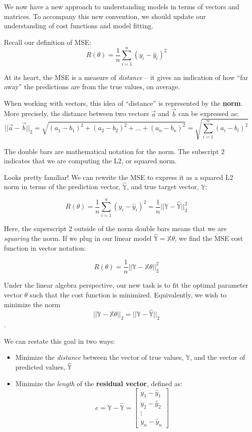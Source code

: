 \documentclass[
  letterpaper,
  DIV=11,
  numbers=noendperiod]{scrreprt}
\providecommand{\tightlist}{%
  \setlength{\itemsep}{0pt}\setlength{\parskip}{0pt}}\usepackage{longtable,booktabs,array}
\begin{document}
We now have a new approach to understanding models in terms of vectors
and matrices. To accompany this new convention, we should update our
understanding of cost functions and model fitting.

Recall our definition of MSE:
\[R(\theta) = \frac{1}{n} \sum_{i=1}^n (y_i - \hat{y}_i)^2\]

At its heart, the MSE is a measure of \emph{distance} -- it gives an
indication of how ``far away'' the predictions are from the true values,
on average.

When working with vectors, this idea of ``distance'' is represented by
the \textbf{norm}. More precisely, the distance between two vectors
\(\vec{a}\) and \(\vec{b}\) can be expressed as:
\[||\vec{a} - \vec{b}||_2 = \sqrt{(a_1 - b_1)^2 + (a_2 - b_2)^2 + \ldots + (a_n - b_n)^2} = \sqrt{\sum_{i=1}^n (a_i - b_i)^2}\]

The double bars are mathematical notation for the norm. The subscript 2
indicates that we are computing the L2, or squared norm.

Looks pretty familiar! We can rewrite the MSE to express it as a squared
L2 norm in terms of the prediction vector, \(\hat{\mathbb{Y}}\), and
true target vector, \(\mathbb{Y}\):

\[R(\theta) = \frac{1}{n} \sum_{i=1}^n (y_i - \hat{y}_i)^2 = \frac{1}{n} ||\mathbb{Y} - \hat{\mathbb{Y}}||_2^2\]

Here, the superscript 2 outside of the norm double bars means that we
are \emph{squaring} the norm. If we plug in our linear model
\(\hat{\mathbb{Y}} = \mathbb{X} \theta\), we find the MSE cost function
in vector notation:

\[R(\theta) = \frac{1}{n} ||\mathbb{Y} - \mathbb{X} \theta||_2^2\]

Under the linear algebra perspective, our new task is to fit the optimal
parameter vector \(\theta\) such that the cost function is minimized.
Equivalently, we wish to minimize the norm
\[||\mathbb{Y} - \mathbb{X} \theta||_2 = ||\mathbb{Y} - \hat{\mathbb{Y}}||_2\].

We can restate this goal in two ways:

\begin{itemize}
\tightlist
\item
  Minimize the \emph{distance} between the vector of true values,
  \(\mathbb{Y}\), and the vector of predicted values,
  \(\mathbb{\hat{Y}}\)
\item
  Minimize the \emph{length} of the \textbf{residual vector}, defined
  as: \[e = \mathbb{Y} - \mathbb{\hat{Y}} = \begin{bmatrix}
           y_1 - \hat{y}_1 \\
           y_2 - \hat{y}_2 \\
           \vdots \\
           y_n - \hat{y}_n
         \end{bmatrix}\]
\end{itemize}
\end{document}
